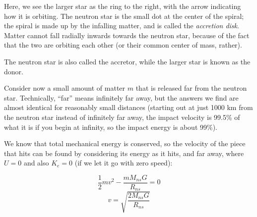 \begin{figure}[H]
  \centering
{}
\end{figure}

Here, we see the larger star as the ring to the right, with the arrow indicating how it is orbiting. The neutron star is the small dot at the center of the spiral; the spiral is made up by the infalling matter, and is called the \emph{accretion disk}. Matter cannot fall radially inwards towards the neutron star, because of the fact that the two are orbiting each other (or their common center of mass, rather).

The neutron star is also called the accretor, while the larger star is known as the donor.

Consider now a small amount of matter $m$ that is released far from the neutron star. Technically, ``far'' means infinitely far away, but the answers we find are almost identical for reasonably small distances (starting out at just 1000 km from the neutron star instead of infinitely far away, the impact velocity is 99.5\% of what it is if you begin at infinity, so the impact energy is about 99\%).

We know that total mechanical energy is conserved, so the velocity of the piece that hits can be found by considering its energy as it hits, and far away, where $U = 0$ and also $K_e = 0$ (if we let it go with zero speed):

\begin{equation}
\frac{1}{2} m v^2 - \frac{m M_{ns} G}{R_{ns}} = 0
\end{equation}
\begin{equation}
v = \sqrt{\frac{2 M_{ns} G}{R_{ns}}}
\end{equation}

